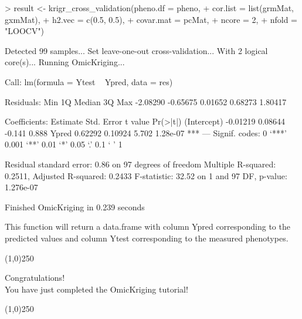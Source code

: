 \documentclass[a4paper]{article}
\begin{document}
\begin{Schunk}

\begin{Schunk}
\begin{Sinput}
> result <- krigr_cross_validation(pheno.df = pheno,
+ 	cor.list = list(grmMat, gxmMat),
+ 	h2.vec = c(0.5, 0.5),
+ 	covar.mat = pcMat,
+ 	ncore = 2,
+ 	nfold = "LOOCV")
\end{Sinput}
\begin{Soutput}
Detected 99 samples... 
Set leave-one-out cross-validation... 
With 2 logical core(s)... 
Running OmicKriging... 

Call:
lm(formula = Ytest ~ Ypred, data = res)

Residuals:
     Min       1Q   Median       3Q      Max 
-2.08290 -0.65675  0.01652  0.68273  1.80417 

Coefficients:
            Estimate Std. Error t value Pr(>|t|)    
(Intercept) -0.01219    0.08644  -0.141    0.888    
Ypred        0.62292    0.10924   5.702 1.28e-07 ***
---
Signif. codes:  0 ‘***’ 0.001 ‘**’ 0.01 ‘*’ 0.05 ‘.’ 0.1 ‘ ’ 1

Residual standard error: 0.86 on 97 degrees of freedom
Multiple R-squared:  0.2511,	Adjusted R-squared:  0.2433 
F-statistic: 32.52 on 1 and 97 DF,  p-value: 1.276e-07

Finished OmicKriging in 0.239 seconds 
\end{Soutput}
\end{Schunk}

\end{Schunk}
This function will return a data.frame with column Ypred corresponding to the predicted values and column Ytest corresponding to the measured phenotypes.
\begin{center}
\line(1,0){250}
\end{center}
\begin{center}
Congratulations! 
\\
You have just completed the OmicKriging tutorial!
\end{center}
\begin{center}
\line(1,0){250}
\end{center}
\end{document}
